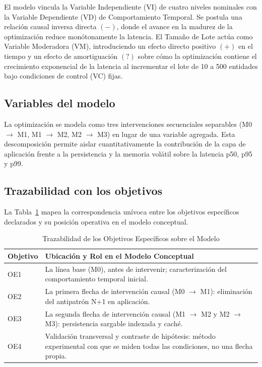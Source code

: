 \documentclass[conference]{IEEEtran}
\begin{document}
El modelo vincula la Variable Independiente (VI) de cuatro niveles nominales con la Variable Dependiente (VD) de Comportamiento Temporal. Se postula una relación causal inversa directa $(-)$, donde el avance en la madurez de la optimización reduce monótonamente la latencia. El Tamaño de Lote actúa como Variable Moderadora (VM), introduciendo un efecto directo positivo $(+)$ en el tiempo y un efecto de amortiguación $(?)$ sobre cómo la optimización contiene el crecimiento exponencial de la latencia al incrementar el lote de 10 a 500 entidades bajo condiciones de control (VC) fijas.

\subsection{Variables del modelo}
La optimización se modela como tres intervenciones secuenciales separables (M0 $\to$ M1, M1 $\to$ M2, M2 $\to$ M3) en lugar de una variable agregada. Esta descomposición permite aislar cuantitativamente la contribución de la capa de aplicación frente a la persistencia y la memoria volátil sobre la latencia p50, p95 y p99.

\subsection{Trazabilidad con los objetivos}
La Tabla~\ref{tab:trazabilidad_oe} mapea la correspondencia unívoca entre los objetivos específicos declarados y su posición operativa en el modelo conceptual.

\begin{table}[!ht]
\centering
\caption{Trazabilidad de los Objetivos Específicos sobre el Modelo}
\label{tab:trazabilidad_oe}
\scriptsize
\setlength{\tabcolsep}{2.5pt}
\begin{tabularx}{\columnwidth}{|>{\raggedright\arraybackslash}p{1.5cm}|>{\raggedright\arraybackslash}X|}
\hline
\textbf{Objetivo} & \textbf{Ubicación y Rol en el Modelo Conceptual} \\
\hline
OE1 & La línea base (M0), antes de intervenir; caracterización del comportamiento temporal inicial. \\
\hline
OE2 & La primera flecha de intervención causal (M0 $\to$ M1): eliminación del antipatrón N+1 en aplicación. \\
\hline
OE3 & La segunda flecha de intervención causal (M1 $\to$ M2 y M2 $\to$ M3): persistencia sargable indexada y caché. \\
\hline
OE4 & Validación transversal y contraste de hipótesis: método experimental con que se miden todas las condiciones, no una flecha propia. \\
\hline
\end{tabularx}
\end{table}
\end{document}

